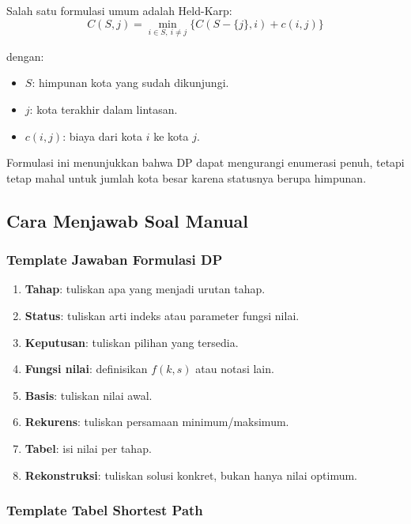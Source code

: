Salah satu formulasi umum adalah Held-Karp:
\begin{equation}
    C(S,j)=\min_{i\in S,\ i\ne j}\{C(S-\{j\},i)+c(i,j)\}
    \label{eq:dp-tsp-held-karp}
\end{equation}

dengan:
\begin{itemize}
    \item $S$: himpunan kota yang sudah dikunjungi.
    \item $j$: kota terakhir dalam lintasan.
    \item $c(i,j)$: biaya dari kota $i$ ke kota $j$.
\end{itemize}

Formulasi ini menunjukkan bahwa DP dapat mengurangi enumerasi penuh, tetapi tetap mahal untuk jumlah kota besar karena statusnya berupa himpunan.

\subsection{Cara Menjawab Soal Manual}

\subsubsection{Template Jawaban Formulasi DP}

\begin{enumerate}
    \item \textbf{Tahap}: tuliskan apa yang menjadi urutan tahap.
    \item \textbf{Status}: tuliskan arti indeks atau parameter fungsi nilai.
    \item \textbf{Keputusan}: tuliskan pilihan yang tersedia.
    \item \textbf{Fungsi nilai}: definisikan $f(k,s)$ atau notasi lain.
    \item \textbf{Basis}: tuliskan nilai awal.
    \item \textbf{Rekurens}: tuliskan persamaan minimum/maksimum.
    \item \textbf{Tabel}: isi nilai per tahap.
    \item \textbf{Rekonstruksi}: tuliskan solusi konkret, bukan hanya nilai optimum.
\end{enumerate}

\subsubsection{Template Tabel Shortest Path}

